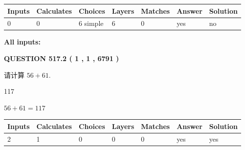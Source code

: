 \documentclass{ctexart}
\begin{document}
   
\noindent\begin{tabular}{|l|l|l|l|l|l|l|}
 \hline
Inputs & Calculates & Choices & Layers & Matches & Answer & Solution \\ \hline
 0  & 
 0  & 
 6
  simple  
  & 
 6  & 
 0  & 
  yes & 
  no 
  \\ \hline
 \end{tabular}
   
   
   
   
\noindent{}
   
   
   
   
\noindent\vspace{0.1in}\hspace{-0.08in} {\textbf{\Large{All inputs: }}}
   
   
  
\vspace{0.2in}
  
{\textbf{\Large{QUESTION
517.2 
 ( 1 , 1 , 6791 )
}}}
  
  
 
请计算 $ %
56 +  %
61 $.
 
 
 
\noindent{}
 
 

117
 
 
\noindent{}
 
 

 
 
 
\noindent{}
 
 

$ %
56 +  %
61=   %
117$
 
 
\noindent{}
 
 

 
   
   
   
   
\noindent\begin{tabular}{|l|l|l|l|l|l|l|}
 \hline
Inputs & Calculates & Choices & Layers & Matches & Answer & Solution \\ \hline
 2  & 
 1  & 
 0
  & 
 0  & 
 0  & 
  yes & 
  yes 
  \\ \hline
 \end{tabular}
   
\end{document}
